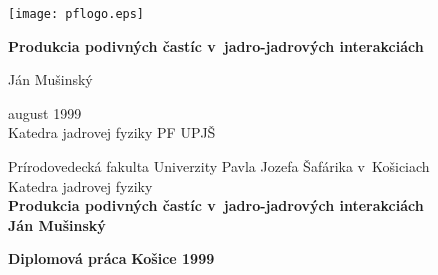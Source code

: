 \begin{titlepage}
  \begin{center}
    \texttt{[image: pflogo.eps]}
  \end{center}
  \vspace*{2.5cm}
  \begin{center}
    {\Large{\bf Produkcia podivných častíc v~jadro-jadrových
        interakciách}}
  \end{center}
  \vspace*{2cm}
  \begin{center}
    {\Large Ján Mušinský}
  \end{center}
  \vspace*{5cm}
  \begin{center}
    august 1999 \\
    Katedra jadrovej fyziky PF UPJŠ
  \end{center}

\end{titlepage}
\begin{titlepage}
  \vspace*{2cm} \begin{center}
    {\LARGE Prírodovedecká fakulta Univerzity Pavla
      Jozefa Šafárika v~Košiciach \\ \vspace{3ex} Katedra jadrovej fyziky}
    \\ \vspace{3cm} {\Huge{\bf Produkcia podivných častíc
        v~jadro-jadrových interakciách}} \\ \vspace{1cm}
       {\large{\bf Ján Mušinský}} \end{center}
  \vspace{6cm} {\bf Diplomová práca} \hfill {\bf Košice 1999}
\end{titlepage}
